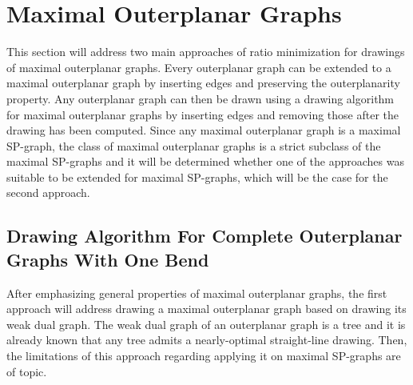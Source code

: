 \section{Maximal Outerplanar Graphs}\label{s:maximal_outerplanar}

This section will address two main approaches of ratio minimization for drawings of maximal outerplanar graphs. Every outerplanar graph can be extended to a maximal outerplanar graph by inserting edges and preserving the outerplanarity property. Any outerplanar graph can then be drawn using a drawing algorithm for maximal outerplanar graphs by inserting edges and removing those after the drawing has been computed. Since any maximal outerplanar graph is a maximal SP-graph, the class of maximal outerplanar graphs is a strict subclass of the maximal SP-graphs and it will be determined whether one of the approaches was suitable to be extended for maximal SP-graphs, which will be the case for the second approach.\\

\subsection{Drawing Algorithm For Complete Outerplanar Graphs With One Bend}
After emphasizing general properties of maximal outerplanar graphs, the first approach will address drawing a maximal outerplanar graph based on drawing its weak dual graph. The weak dual graph of an outerplanar graph is a tree and it is already known that any tree admits a nearly-optimal straight-line drawing. Then, the limitations of this approach regarding applying it on maximal SP-graphs are of topic.

